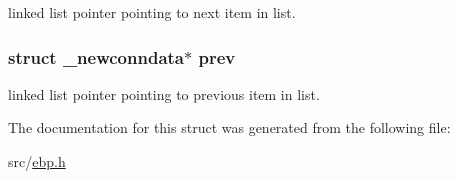 linked list pointer pointing to next item in list. 

\hypertarget{struct__newconndata_aeec1dced4bad04f81af5d652efe01922}{
\subsubsection[{prev}]{\setlength{\rightskip}{0pt plus 5cm}struct {\bf \-\_\-newconndata}$\ast$ {\bf prev}}}\label{struct__newconndata_aeec1dced4bad04f81af5d652efe01922}


linked list pointer pointing to previous item in list. 



\-The documentation for this struct was generated from the following file\-:\begin{DoxyCompactItemize}
\item 
src/\hyperlink{ebp_8h}{ebp.\-h}\end{DoxyCompactItemize}
